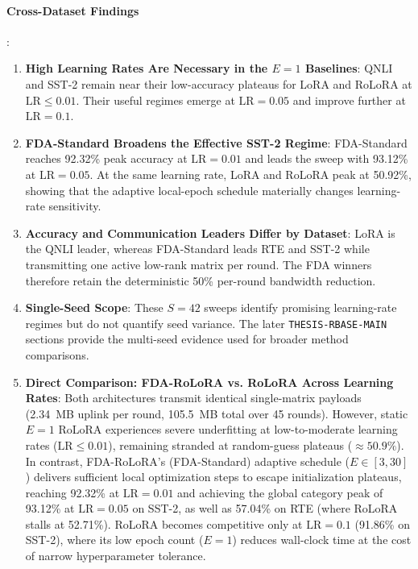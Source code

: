 \documentclass[10pt,a4paper]{article}
\begin{document}
\paragraph{Cross-Dataset Findings}:
\begin{enumerate}
    \item \textbf{High Learning Rates Are Necessary in the $E=1$ Baselines}: QNLI and SST-2 remain near their low-accuracy plateaus for LoRA and RoLoRA at $\mathrm{LR} \leq 0.01$. Their useful regimes emerge at $\mathrm{LR}=0.05$ and improve further at $\mathrm{LR}=0.1$.
    \item \textbf{FDA-Standard Broadens the Effective SST-2 Regime}: FDA-Standard reaches 92.32\% peak accuracy at $\mathrm{LR}=0.01$ and leads the sweep with 93.12\% at $\mathrm{LR}=0.05$. At the same learning rate, LoRA and RoLoRA peak at 50.92\%, showing that the adaptive local-epoch schedule materially changes learning-rate sensitivity.
    \item \textbf{Accuracy and Communication Leaders Differ by Dataset}: LoRA is the QNLI leader, whereas FDA-Standard leads RTE and SST-2 while transmitting one active low-rank matrix per round. The FDA winners therefore retain the deterministic 50\% per-round bandwidth reduction.
    \item \textbf{Single-Seed Scope}: These $S=42$ sweeps identify promising learning-rate regimes but do not quantify seed variance. The later \texttt{THESIS-RBASE-MAIN} sections provide the multi-seed evidence used for broader method comparisons.
    \item \textbf{Direct Comparison: FDA-RoLoRA vs. RoLoRA Across Learning Rates}: Both architectures transmit identical single-matrix payloads (2.34~MB uplink per round, 105.5~MB total over 45 rounds). However, static $E=1$ RoLoRA experiences severe underfitting at low-to-moderate learning rates ($\mathrm{LR} \leq 0.01$), remaining stranded at random-guess plateaus ($\approx 50.9\%$). In contrast, FDA-RoLoRA's (FDA-Standard) adaptive schedule ($E \in [3, 30]$) delivers sufficient local optimization steps to escape initialization plateaus, reaching 92.32\% at $\mathrm{LR}=0.01$ and achieving the global category peak of 93.12\% at $\mathrm{LR}=0.05$ on SST-2, as well as 57.04\% on RTE (where RoLoRA stalls at 52.71\%). RoLoRA becomes competitive only at $\mathrm{LR}=0.1$ (91.86\% on SST-2), where its low epoch count ($E=1$) reduces wall-clock time at the cost of narrow hyperparameter tolerance.
\end{enumerate}
\end{document}
